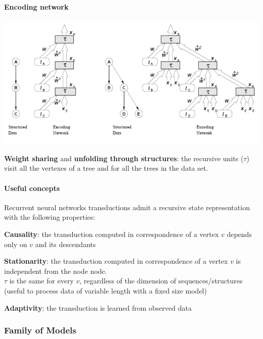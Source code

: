 \documentclass[10pt]{report}
\begin{document}
\paragraph{Encoding network} 
\begin{center}
	\includegraphics[scale=0.5]{43.png}
\end{center}
\textbf{Weight sharing} and \textbf{unfolding through structures}: the recursive units ($\tau$) visit all the vertexes of a tree and for all the trees in the data set.
\paragraph{Useful concepts} Recurrent neural networks transductions admit a recursive state representation with the following properties:
\begin{list}{}{}
	\item \textbf{Causality}: the transduction computed in correspondence of a vertex $v$ depends only on $v$ and its descendants
	\item \textbf{Stationarity}: the transduction computed in correspondence of a vertex $v$ is independent from the node node.\\
	$\tau$ is the same for every $v$, regardless of the dimension of sequences/structures (useful to process data of variable length with a fixed size model)
	\item \textbf{Adaptivity}: the transduction is learned from observed data
\end{list}
\subsubsection{Family of Models}
\end{document}
